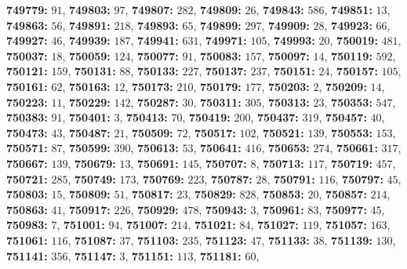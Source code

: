 \textsf{\bfseries 749779:} $91$, \textsf{\bfseries 749803:} $97$, \textsf{\bfseries 749807:} $282$, \textsf{\bfseries 749809:} $26$, \textsf{\bfseries 749843:} $586$, \textsf{\bfseries 749851:} $13$, \textsf{\bfseries 749863:} $56$, \textsf{\bfseries 749891:} $218$, \textsf{\bfseries 749893:} $65$, \textsf{\bfseries 749899:} $297$, \textsf{\bfseries 749909:} $28$, \textsf{\bfseries 749923:} $66$, \textsf{\bfseries 749927:} $46$, \textsf{\bfseries 749939:} $187$, \textsf{\bfseries 749941:} $631$, \textsf{\bfseries 749971:} $105$, \textsf{\bfseries 749993:} $20$, \textsf{\bfseries 750019:} $481$, \textsf{\bfseries 750037:} $18$, \textsf{\bfseries 750059:} $124$, \textsf{\bfseries 750077:} $91$, \textsf{\bfseries 750083:} $157$, \textsf{\bfseries 750097:} $14$, \textsf{\bfseries 750119:} $592$, \textsf{\bfseries 750121:} $159$, \textsf{\bfseries 750131:} $88$, \textsf{\bfseries 750133:} $227$, \textsf{\bfseries 750137:} $237$, \textsf{\bfseries 750151:} $24$, \textsf{\bfseries 750157:} $105$, \textsf{\bfseries 750161:} $62$, \textsf{\bfseries 750163:} $12$, \textsf{\bfseries 750173:} $210$, \textsf{\bfseries 750179:} $177$, \textsf{\bfseries 750203:} $2$, \textsf{\bfseries 750209:} $14$, \textsf{\bfseries 750223:} $11$, \textsf{\bfseries 750229:} $142$, \textsf{\bfseries 750287:} $30$, \textsf{\bfseries 750311:} $305$, \textsf{\bfseries 750313:} $23$, \textsf{\bfseries 750353:} $547$, \textsf{\bfseries 750383:} $91$, \textsf{\bfseries 750401:} $3$, \textsf{\bfseries 750413:} $70$, \textsf{\bfseries 750419:} $200$, \textsf{\bfseries 750437:} $319$, \textsf{\bfseries 750457:} $40$, \textsf{\bfseries 750473:} $43$, \textsf{\bfseries 750487:} $21$, \textsf{\bfseries 750509:} $72$, \textsf{\bfseries 750517:} $102$, \textsf{\bfseries 750521:} $139$, \textsf{\bfseries 750553:} $153$, \textsf{\bfseries 750571:} $87$, \textsf{\bfseries 750599:} $390$, \textsf{\bfseries 750613:} $53$, \textsf{\bfseries 750641:} $416$, \textsf{\bfseries 750653:} $274$, \textsf{\bfseries 750661:} $317$, \textsf{\bfseries 750667:} $139$, \textsf{\bfseries 750679:} $13$, \textsf{\bfseries 750691:} $145$, \textsf{\bfseries 750707:} $8$, \textsf{\bfseries 750713:} $117$, \textsf{\bfseries 750719:} $457$, \textsf{\bfseries 750721:} $285$, \textsf{\bfseries 750749:} $173$, \textsf{\bfseries 750769:} $223$, \textsf{\bfseries 750787:} $28$, \textsf{\bfseries 750791:} $116$, \textsf{\bfseries 750797:} $45$, \textsf{\bfseries 750803:} $15$, \textsf{\bfseries 750809:} $51$, \textsf{\bfseries 750817:} $23$, \textsf{\bfseries 750829:} $828$, \textsf{\bfseries 750853:} $20$, \textsf{\bfseries 750857:} $214$, \textsf{\bfseries 750863:} $41$, \textsf{\bfseries 750917:} $226$, \textsf{\bfseries 750929:} $478$, \textsf{\bfseries 750943:} $3$, \textsf{\bfseries 750961:} $83$, \textsf{\bfseries 750977:} $45$, \textsf{\bfseries 750983:} $7$, \textsf{\bfseries 751001:} $94$, \textsf{\bfseries 751007:} $214$, \textsf{\bfseries 751021:} $84$, \textsf{\bfseries 751027:} $119$, \textsf{\bfseries 751057:} $163$, \textsf{\bfseries 751061:} $116$, \textsf{\bfseries 751087:} $37$, \textsf{\bfseries 751103:} $235$, \textsf{\bfseries 751123:} $47$, \textsf{\bfseries 751133:} $38$, \textsf{\bfseries 751139:} $130$, \textsf{\bfseries 751141:} $356$, \textsf{\bfseries 751147:} $3$, \textsf{\bfseries 751151:} $113$, \textsf{\bfseries 751181:} $60$, 
